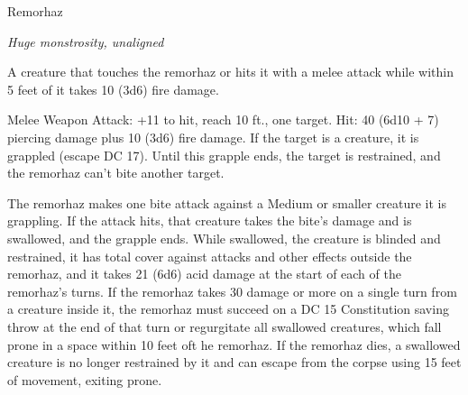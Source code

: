 \begin{monsterbox}{Remorhaz}
\begin{hangingpar}
\textit{Huge monstrosity, unaligned}
\end{hangingpar}
\dndline%
\basics[%
armorclass = 17,
hitpoints = 17d12 + 85,
speed = {30 ft., burrow 20 ft.}
]
\dndline%
\stats[%
STR = \stat{24},
DEX = \stat{13},
CON = \stat{21},
INT = \stat{4},
WIS = \stat{10},
CHA = \stat{5}
]
\dndline%
\details[%
skills={},
damageimmunities={cold, fire},
savingthrows={},
conditionimmunities={},
damageresistances={},
damagevulnerabilities={},
senses={darkvision 60 ft., tremorsense 60 ft., passive Perception 10},
challenge=11
]
\dndline%
\begin{monsteraction}
A creature that touches the remorhaz or hits it with a melee attack while within 5 feet of it takes 10 (3d6) fire damage.
\end{monsteraction}
\begin{monsteraction}[Bite]
Melee Weapon Attack: +11 to hit, reach 10 ft., one target. Hit: 40 (6d10 + 7) piercing damage plus 10 (3d6) fire damage. If the target is a creature, it is grappled (escape DC 17). Until this grapple ends, the target is restrained, and the remorhaz can't bite another target.
\end{monsteraction}
\begin{monsteraction}[Swallow]
The remorhaz makes one bite attack against a Medium or smaller creature it is grappling. If the attack hits, that creature takes the bite's damage and is swallowed, and the grapple ends. While swallowed, the creature is blinded and restrained, it has total cover against attacks and other effects outside the remorhaz, and it takes 21 (6d6) acid damage at the start of each of the remorhaz's turns.
If the remorhaz takes 30 damage or more on a single turn from a creature inside it, the remorhaz must succeed on a DC 15 Constitution saving throw at the end of that turn or regurgitate all swallowed creatures, which fall prone in a space within 10 feet oft he remorhaz. If the remorhaz dies, a swallowed creature is no longer restrained by it and can escape from the corpse using 15 feet of movement, exiting prone.
\end{monsteraction}
\end{monsterbox}